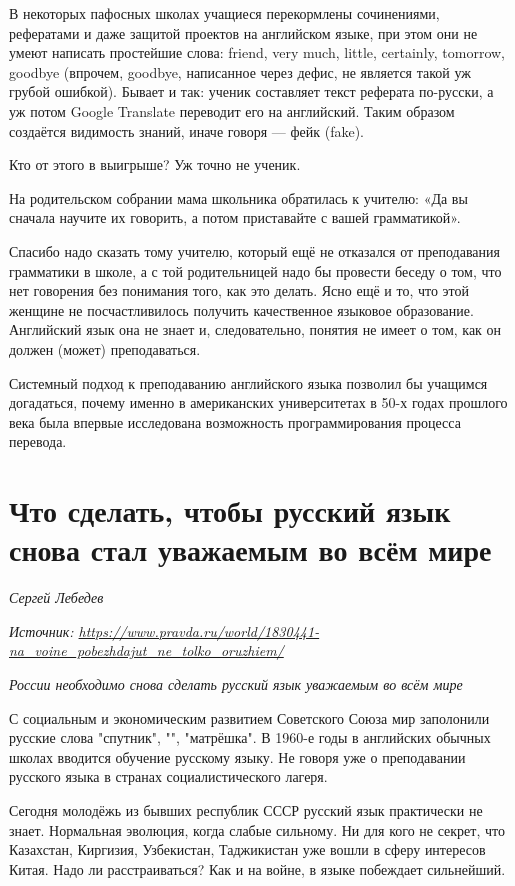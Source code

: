 В некоторых пафосных школах учащиеся перекормлены сочинениями, рефератами и даже защитой проектов на английском языке, при этом они не умеют написать простейшие слова: friend, very much, little, certainly, tomorrow, goodbye (впрочем, goodbye, написанное через дефис, не является такой уж грубой ошибкой). Бывает и так: ученик составляет текст реферата по-русски, а уж потом Google Translate переводит его на английский. Таким образом создаётся видимость знаний, иначе говоря --- фейк (fake).

Кто от этого в выигрыше? Уж точно не ученик.

На родительском собрании мама школьника обратилась к учителю: «Да вы сначала научите их говорить, а потом приставайте с вашей грамматикой».

Спасибо надо сказать тому учителю, который ещё не отказался от преподавания грамматики в школе, а с той родительницей надо бы провести беседу о том, что нет говорения без понимания того, как это делать. Ясно ещё и то, что этой женщине не посчастливилось получить качественное языковое образование. Английский язык она не знает и, следовательно, понятия не имеет о том, как он должен (может) преподаваться.

Системный подход к преподаванию английского языка позволил бы учащимся догадаться, почему именно в американских университетах в 50-х годах прошлого века была впервые исследована возможность программирования процесса перевода.


\newpage
\section{Что сделать, чтобы русский язык снова стал уважаемым во всём мире}

\textit{Сергей Лебедев}

\textit{Источник: \url{https://www.pravda.ru/world/1830441-na_voine_pobezhdajut_ne_tolko_oruzhiem/}}

\textit{России необходимо снова сделать русский язык уважаемым во всём мире}

С социальным и экономическим развитием Советского Союза мир заполонили русские слова "спутник", "", "матрёшка". В 1960-е годы в английских обычных школах вводится обучение русскому языку. Не говоря уже о преподавании русского языка в странах социалистического лагеря.

Сегодня молодёжь из бывших республик СССР русский язык практически не знает. Нормальная эволюция, когда слабые  сильному. Ни для кого не секрет, что Казахстан, Киргизия, Узбекистан, Таджикистан уже вошли в сферу интересов Китая. Надо ли расстраиваться? Как и на войне, в языке побеждает сильнейший.

